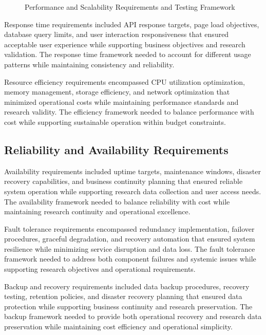 \begin{figure}[H]
\centering
\caption{Performance and Scalability Requirements and Testing Framework}
\label{fig:performance-scalability-framework}
\end{figure}

Response time requirements included API response targets, page load objectives, database query limits, and user interaction responsiveness that ensured acceptable user experience while supporting business objectives and research validation. The response time framework needed to account for different usage patterns while maintaining consistency and reliability.

Resource efficiency requirements encompassed CPU utilization optimization, memory management, storage efficiency, and network optimization that minimized operational costs while maintaining performance standards and research validity. The efficiency framework needed to balance performance with cost while supporting sustainable operation within budget constraints.

\subsection{Reliability and Availability Requirements}

Availability requirements included uptime targets, maintenance windows, disaster recovery capabilities, and business continuity planning that ensured reliable system operation while supporting research data collection and user access needs. The availability framework needed to balance reliability with cost while maintaining research continuity and operational excellence.

Fault tolerance requirements encompassed redundancy implementation, failover procedures, graceful degradation, and recovery automation that ensured system resilience while minimizing service disruption and data loss. The fault tolerance framework needed to address both component failures and systemic issues while supporting research objectives and operational requirements.

Backup and recovery requirements included data backup procedures, recovery testing, retention policies, and disaster recovery planning that ensured data protection while supporting business continuity and research preservation. The backup framework needed to provide both operational recovery and research data preservation while maintaining cost efficiency and operational simplicity.

